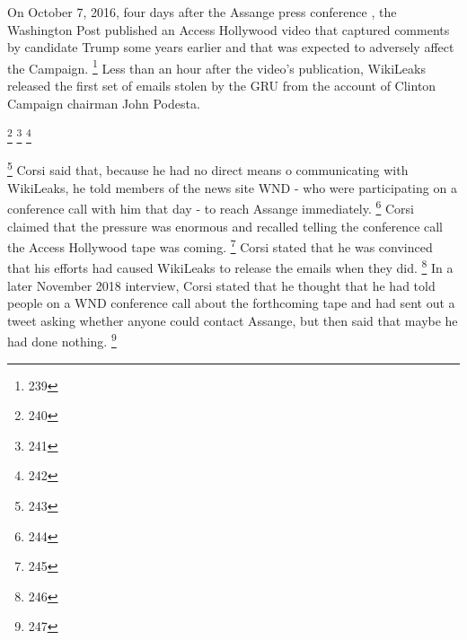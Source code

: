 On October 7, 2016, four days after the Assange press conference , the Washington Post published an Access Hollywood video that captured comments by candidate Trump some years earlier and that was expected to adversely affect the Campaign.%
\footnote{239}
Less than an hour after the video's publication, WikiLeaks released the first set of emails stolen by the GRU from the account of Clinton Campaign chairman John Podesta.

\footnote{240}
\footnote{241}
\footnote{242}

\footnote{243}
Corsi said that, because he had no direct means o communicating with WikiLeaks, he told members of the news site WND - who were participating on a conference call with him that day - to reach Assange immediately.%
\footnote{244}
Corsi claimed that the pressure was enormous and recalled telling the conference call the Access Hollywood tape was coming.%
\footnote{245}
Corsi stated that he was convinced that his efforts had caused WikiLeaks to release the emails when they did.%
\footnote{246}
In a later November 2018 interview, Corsi stated that he thought that he had told people on a WND conference call about the forthcoming tape and had sent out a tweet asking whether anyone could contact Assange, but then said that maybe he had done nothing.%
\footnote{247}

